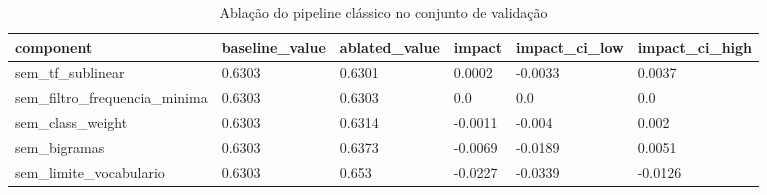 \begin{table}[ht]
\centering
\caption{Ablação do pipeline clássico no conjunto de validação}
\label{tab:ablacao}
\begin{tabular}{llllll}
\toprule
component & baseline\_value & ablated\_value & impact & impact\_ci\_low & impact\_ci\_high \\
\midrule
sem\_tf\_sublinear & 0.6303 & 0.6301 & 0.0002 & -0.0033 & 0.0037 \\
sem\_filtro\_frequencia\_minima & 0.6303 & 0.6303 & 0.0 & 0.0 & 0.0 \\
sem\_class\_weight & 0.6303 & 0.6314 & -0.0011 & -0.004 & 0.002 \\
sem\_bigramas & 0.6303 & 0.6373 & -0.0069 & -0.0189 & 0.0051 \\
sem\_limite\_vocabulario & 0.6303 & 0.653 & -0.0227 & -0.0339 & -0.0126 \\
\bottomrule
\end{tabular}
\end{table}
